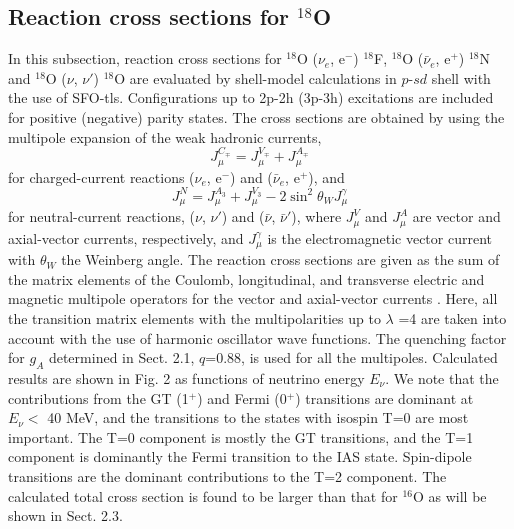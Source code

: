 \documentclass[preprint,12pt]{elsarticle}
\begin{document}
\subsection{Reaction cross sections for $^{18}$O}
In this subsection, reaction cross sections for $^{18}$O ($\nu_e$, e$^{-}$) $^{18}$F, $^{18}$O ($\bar{\nu}_e$, e$^{+}$) $^{18}$N and $^{18}$O ($\nu$, $\nu'$) $^{18}$O are evaluated by shell-model calculations in $p$-$sd$ shell with the use of SFO-tls.
Configurations up to 2p-2h (3p-3h) excitations are included for positive (negative) parity states. 
The cross sections are obtained by using the multipole expansion of the weak hadronic currents,
\begin{equation}
J_{\mu}^{C_{\mp}} = J_{\mu}^{V_{\mp}} + J_{\mu}^{A_{\mp}} 
\end{equation}
for charged-current reactions ($\nu_e$, e$^{-}$) and ($\bar{\nu}_e$, e$^{+}$), and 
\begin{equation}
J_{\mu}^{N} = J_{\mu}^{A_3} + J_{\mu}^{V_3} -2 \sin^2\theta_{W} J_{\mu}^{\gamma}
\end{equation}
for neutral-current reactions, ($\nu$, $\nu'$) and ($\bar{\nu}$, $\bar{\nu}'$), where $J_{\mu}^{V}$ and $J_{\mu}^{A}$ are vector and axial-vector currents, respectively, and $J_{\mu}^{\gamma}$ is the electromagnetic vector current with $\theta_{W}$ the Weinberg angle. 
The reaction cross sections are given as the sum of the matrix elements of the Coulomb, longitudinal, and transverse electric and magnetic multipole operators for the vector and axial-vector currents \cite{Wal,SC2006}. 
Here, all the transition matrix elements with the multipolarities up to $\lambda$ =4 are taken into account with the use of harmonic oscillator wave functions.
The quenching factor for $g_A$ determined in Sect. 2.1, $q$=0.88, is used for all the multipoles.
Calculated results are shown in Fig. 2 as functions of neutrino energy $E_{\nu}$.
We note that the contributions from the GT (1$^{+}$) and Fermi (0$^{+}$) transitions are dominant at $E_{\nu} <$ 40 MeV, and 
the transitions to the states with isospin T=0 are most important. 
The T=0 component is mostly the GT transitions, and
the T=1 component is dominantly the Fermi transition to the IAS state.
Spin-dipole transitions are the dominant contributions to the T=2 component.
The calculated total cross section is found to be larger than that for $^{16}$O as will be shown in Sect. 2.3.
\end{document}
